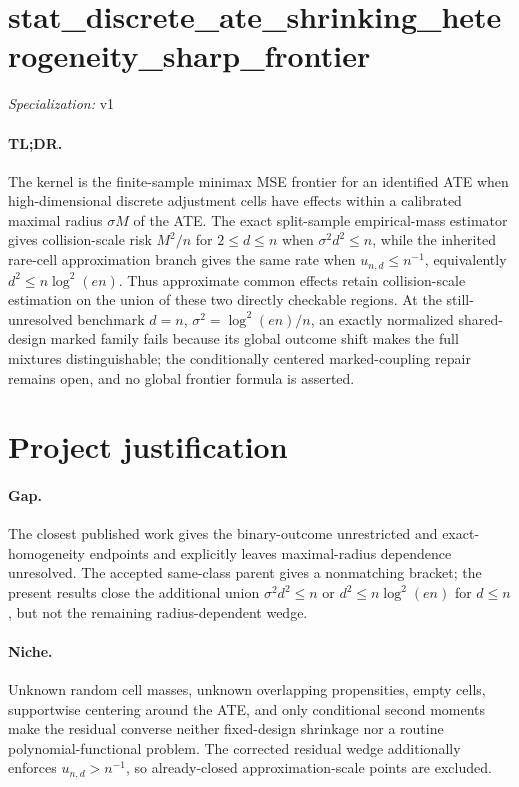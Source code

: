 \documentclass{article}
\begin{document}
\sloppy

\section*{stat\_\allowbreak{}discrete\_\allowbreak{}ate\_\allowbreak{}shrinking\_\allowbreak{}heterogeneity\_\allowbreak{}sharp\_\allowbreak{}frontier}

\noindent\textit{Specialization:} v1\par

\paragraph{TL;DR.} The kernel is the finite-sample minimax MSE frontier for an identified ATE when high-dimensional discrete adjustment cells have effects within a calibrated maximal radius \(\sigma M\) of the ATE.  The exact split-sample empirical-mass estimator gives collision-scale risk \(M^2/n\) for \(2\le d\le n\) when \(\sigma^2d^2\le n\), while the inherited rare-cell approximation branch gives the same rate when \(u_{n,d}\le n^{-1}\), equivalently \(d^2\le n\log^2(en)\).  Thus approximate common effects retain collision-scale estimation on the union of these two directly checkable regions.  At the still-unresolved benchmark \(d=n\), \(\sigma^2=\log^2(en)/n\), an exactly normalized shared-design marked family fails because its global outcome shift makes the full mixtures distinguishable; the conditionally centered marked-coupling repair remains open, and no global frontier formula is asserted.

\section{Project justification}

\paragraph{Gap.} The closest published work gives the binary-outcome unrestricted and exact-homogeneity endpoints and explicitly leaves maximal-radius dependence unresolved.  The accepted same-class parent gives a nonmatching bracket; the present results close the additional union \(\sigma^2d^2\le n\) or \(d^2\le n\log^2(en)\) for \(d\le n\), but not the remaining radius-dependent wedge.

\paragraph{Niche.} Unknown random cell masses, unknown overlapping propensities, empty cells, supportwise centering around the ATE, and only conditional second moments make the residual converse neither fixed-design shrinkage nor a routine polynomial-functional problem.  The corrected residual wedge additionally enforces \(u_{n,d}>n^{-1}\), so already-closed approximation-scale points are excluded.
\end{document}
